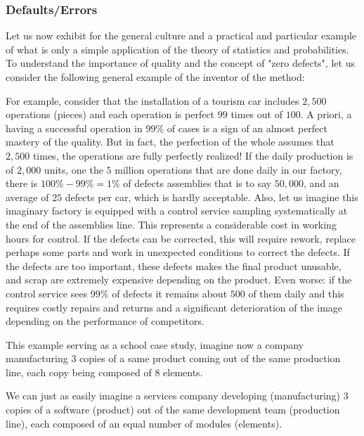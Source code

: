 \subsubsection{Defaults/Errors}

Let us now exhibit for the general culture and a practical and particular example of what is only a simple application of the theory of statistics and probabilities. To understand the importance of quality and the concept of "zero defects", let us consider the following general example of the inventor of the method:

For example, consider that the installation of a tourism car includes $2,500$ operations (pieces) and each operation is perfect $99$ times out of $100$. A priori, a having a successful operation in $99\%$ of cases is a sign of an almost perfect mastery of the quality. But in fact, the perfection of the whole assumes that $2,500$ times, the operations are fully perfectly realized! If the daily production is of $2,000$ units, one the $5$ million operations that are done daily in our factory, there is $100\%-99\%=1\%$ of defects assemblies that is to say $50,000$, and an average of $25$ defects per car, which is hardly acceptable. Also, let us imagine  this imaginary factory is equipped with a control service sampling systematically at the end of the assemblies line. This represents a considerable cost in working hours for control. If the defects can be corrected, this will require rework, replace perhaps some parts and work in unexpected conditions to correct the defects. If the defects are too important, these defects makes the final product unusable, and scrap are extremely expensive depending on the product. Even worse: if the control service sees $99\%$ of defects it remains about $500$  of them daily and this requires costly repairs and returns and a significant deterioration of the image depending on the performance of competitors.

This example serving as a school case study, imagine now a company manufacturing $3$ copies of a same product coming out of the same production line, each copy being composed of $8$ elements.

	\begin{tcolorbox}[title=Remark,colframe=black,arc=10pt]
We can just as easily imagine a services company developing (manufacturing) 3 copies of a software (product) out of the same development team (production line), each composed of an equal number of modules (elements).
	\end{tcolorbox}

